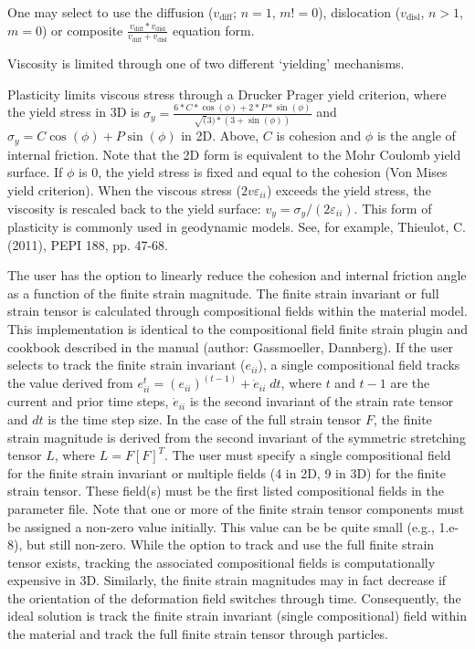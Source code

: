 \begin{itemize}
 One may select to use the diffusion ($v_\text{diff}$; $n=1$, $m!=0$), dislocation ($v_\text{disl}$, $n>1$, $m=0$) or composite $\frac{v_\text{diff}*v_\text{disl}}{v_\text{diff}+v_\text{disl}}$ equation form. 

 Viscosity is limited through one of two different `yielding' mechanisms. 

Plasticity limits viscous stress through a Drucker Prager yield criterion, where the yield stress in 3D is  $\sigma_y = \frac{6*C*\cos(\phi) + 2*P*\sin(\phi)} {\sqrt(3)*(3+\sin(\phi))}$ and $\sigma_y = C\cos(\phi) + P\sin(\phi)$ in 2D. Above, $C$ is cohesion and $\phi$  is the angle of internal friction.  Note that the 2D form is equivalent to the Mohr Coulomb yield surface.  If $\phi$ is 0, the yield stress is fixed and equal to the cohesion (Von Mises yield criterion). When the viscous stress ($2v{\varepsilon}_{ii}$) exceeds the yield stress, the viscosity is rescaled back to the yield surface: $v_{y}=\sigma_{y}/(2{\varepsilon}_{ii})$. This form of plasticity is commonly used in geodynamic models. See, for example, Thieulot, C. (2011), PEPI 188, pp. 47-68. 

The user has the option to linearly reduce the cohesion and internal friction angle as a function of the finite strain magnitude. The finite strain invariant or full strain tensor is calculated through compositional fields within the material model. This implementation is identical to the compositional field finite strain plugin and cookbook described in the manual (author: Gassmoeller, Dannberg). If the user selects to track the finite strain invariant ($e_{ii}$), a single compositional field tracks the value derived from $e_{ii}^t = (e_{ii})^{(t-1)} + \dot{e}_{ii}\; dt$, where $t$ and $t-1$ are the current and prior time steps, $\dot{e}_{ii}$ is the second invariant of the strain rate tensor and $dt$ is the time step size. In the case of the full strain tensor $F$, the finite strain magnitude is derived from the second invariant of the symmetric stretching tensor $L$, where $L = F [F]^T$. The user must specify a single compositional field for the finite strain invariant or multiple fields (4 in 2D, 9 in 3D) for the finite strain tensor. These field(s) must be the first listed compositional fields in the parameter file. Note that one or more of the finite strain tensor components must be assigned a non-zero value initially. This value can be be quite small (e.g., 1.e-8), but still non-zero. While the option to track and use the full finite strain tensor exists, tracking the associated compositional fields is computationally expensive in 3D. Similarly, the finite strain magnitudes may in fact decrease if the orientation of the deformation field switches through time. Consequently, the ideal solution is track the finite strain invariant (single compositional) field within the material and track the full finite strain tensor through particles.


\end{itemize}
